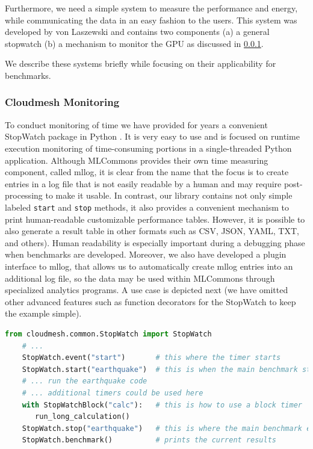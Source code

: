 \documentclass[utf8]{FrontiersinVancouver} %
\begin{document}
Furthermore, we need a simple system to measure the performance and energy, while communicating the data in an easy fashion to the users. This system was developed by von Laszewski and contains two components (a) a general stopwatch (b) a mechanism to monitor the GPU as discussed in \ref{sec:monitoring}.

We describe these systems briefly while focusing on their applicability for benchmarks.

\subsubsection{Cloudmesh Monitoring}
\label{sec:monitoring}

To conduct monitoring of time we have provided for years a convenient StopWatch package in Python \citep{cloudmesh-stopwatch}.  It is very easy to use and is focused on runtime execution monitoring of time-consuming portions in a single-threaded Python application. Although MLCommons provides their own time measuring component, called mllog, it is clear from the name that the focus is to create entries in a log file that is not easily readable by a human and may require post-processing to make it usable. In contrast, our library contains not only simple labeled \texttt{start} and \texttt{stop} methods, it also provides a convenient mechanism to print human-readable customizable performance tables. However, it is possible to also generate a result table in other formats such as CSV, JSON, YAML, TXT, and others).  Human readability is especially important during a debugging phase when benchmarks are developed. Moreover, we also have developed a plugin interface to mllog, that allows us to automatically create mllog entries into an additional log file, so the data may be used within MLCommons through specialized analytics programs. A use case is depicted next (we have omitted other advanced features such as function decorators for the StopWatch to keep the example simple).



\begin{lstlisting}[language=Python]
    from cloudmesh.common.StopWatch import StopWatch 
    # ...
    StopWatch.event("start")       # this where the timer starts
    StopWatch.start("earthquake")  # this is when the main benchmark starts
    # ... run the earthquake code
    # ... additional timers could be used here
    with StopWatchBlock("calc"):   # this is how to use a block timer
       run_long_calculation()
    StopWatch.stop("earthquake")   # this is where the main benchmark ends
    StopWatch.benchmark()          # prints the current results
\end{lstlisting}
\end{document}
